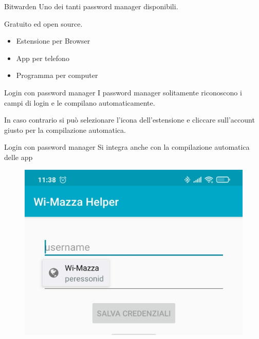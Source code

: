 \begin{myframe}{Bitwarden}
  Uno dei tanti password manager disponibili.

  \medskip\pause
  Gratuito ed open source.

  \medskip\pause
  \begin{itemize}
    \item Estensione per Browser
    \item App per telefono
    \item Programma per computer
  \end{itemize}
\end{myframe}

\begin{myframe}{Login con password manager}
  I password manager solitamente riconoscono i campi di login e le compilano automaticamente.

  \medskip\pause
  In caso contrario si può selezionare l'icona dell'estensione e cliccare sull'account giusto per la compilazione automatica.

\end{myframe}

\begin{myframe}{Login con password manager}
  Si integra anche con la compilazione automatica delle app
  \begin{figure}
    \includegraphics[width=.5\textwidth]{img/loginapp}
  \end{figure}
\end{myframe}

